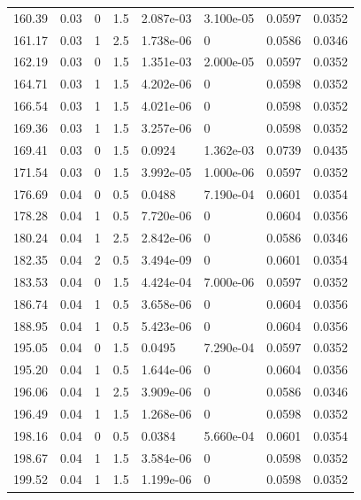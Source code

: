 \documentclass[preview]{standalone}
\begin{document}
{{{\begin{tabular}{L{1.2cm}C{1.2cm} C{0.3cm}C{0.5cm} C{1.4cm}C{1.4cm} C{1.4cm}C{1.4cm}}
  160.39  &  0.03  & 0     & 1.5 &  2.087e-03  & 3.100e-05  & 0.0597 &  0.0352   \\ 
  161.17  &  0.03  & 1     & 2.5 &  1.738e-06  & 0  & 0.0586 &  0.0346   \\ 
  162.19  &  0.03  & 0     & 1.5 &  1.351e-03  & 2.000e-05  & 0.0597 &  0.0352   \\ 
  164.71  &  0.03  & 1     & 1.5 &  4.202e-06  & 0  & 0.0598 &  0.0352   \\ 
  166.54  &  0.03  & 1     & 1.5 &  4.021e-06  & 0  & 0.0598 &  0.0352   \\ 
  169.36  &  0.03  & 1     & 1.5 &  3.257e-06  & 0  & 0.0598 &  0.0352   \\ 
  169.41  &  0.03  & 0     & 1.5 &  0.0924  & 1.362e-03  & 0.0739 &  0.0435   \\ 
  171.54  &  0.03  & 0     & 1.5 &  3.992e-05  & 1.000e-06  & 0.0597 &  0.0352   \\ 
  176.69  &  0.04  & 0     & 0.5 &  0.0488  & 7.190e-04  & 0.0601 &  0.0354   \\ 
  178.28  &  0.04  & 1     & 0.5 &  7.720e-06  & 0  & 0.0604 &  0.0356   \\ 
  180.24  &  0.04  & 1     & 2.5 &  2.842e-06  & 0  & 0.0586 &  0.0346   \\ 
  182.35  &  0.04  & 2     & 0.5 &  3.494e-09  & 0  & 0.0601 &  0.0354   \\ 
  183.53  &  0.04  & 0     & 1.5 &  4.424e-04  & 7.000e-06  & 0.0597 &  0.0352   \\ 
  186.74  &  0.04  & 1     & 0.5 &  3.658e-06  & 0  & 0.0604 &  0.0356   \\ 
  188.95  &  0.04  & 1     & 0.5 &  5.423e-06  & 0  & 0.0604 &  0.0356   \\ 
  195.05  &  0.04  & 0     & 1.5 &  0.0495  & 7.290e-04  & 0.0597 &  0.0352   \\ 
  195.20  &  0.04  & 1     & 0.5 &  1.644e-06  & 0  & 0.0604 &  0.0356   \\ 
  196.06  &  0.04  & 1     & 2.5 &  3.909e-06  & 0  & 0.0586 &  0.0346   \\ 
  196.49  &  0.04  & 1     & 1.5 &  1.268e-06  & 0  & 0.0598 &  0.0352   \\ 
  198.16  &  0.04  & 0     & 0.5 &  0.0384  & 5.660e-04  & 0.0601 &  0.0354   \\ 
  198.67  &  0.04  & 1     & 1.5 &  3.584e-06  & 0  & 0.0598 &  0.0352   \\ 
  199.52  &  0.04  & 1     & 1.5 &  1.199e-06  & 0  & 0.0598 &  0.0352   \\ 

\end{tabular}}}}
\end{document}
